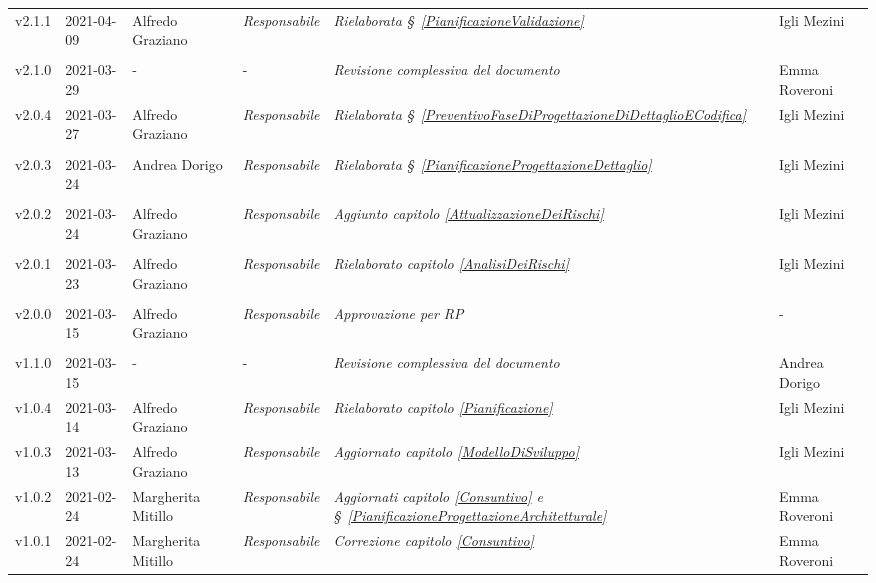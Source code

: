 {\begin{center}
\begin{longtable}[c]{|p{2cm-1\tabcolsep}|p{2cm}|p{3cm-2\tabcolsep}|p{}|p{}|p{4cm-2\tabcolsep}|}
		\hline
		\centering v2.1.1 & 2021-04-09 & Alfredo Graziano & \centering \textit{Responsabile} & \textit{Rielaborata \S~\ref{PianificazioneValidazione} } & \centering Igli Mezini \\ \tabularnewline
		\hline
		\centering v2.1.0 & 2021-03-29 & \centering - & \centering - & \textit{Revisione complessiva del documento} & Emma Roveroni  \\
		\hline
		\centering v2.0.4 & 2021-03-27 & Alfredo Graziano & \centering \textit{Responsabile} & \textit{Rielaborata \S~\ref{PreventivoFaseDiProgettazioneDiDettaglioECodifica} } & \centering Igli Mezini \\ \tabularnewline
		\hline
		\centering v2.0.3 & 2021-03-24 & Andrea Dorigo & \centering \textit{Responsabile} & \textit{Rielaborata \S~\ref{PianificazioneProgettazioneDettaglio}  } & \centering Igli Mezini \\ \tabularnewline
		\hline
		\centering v2.0.2 & 2021-03-24 & Alfredo Graziano & \centering \textit{Responsabile} & \textit{Aggiunto capitolo \ref{AttualizzazioneDeiRischi} } & \centering Igli Mezini \\ \tabularnewline
		\hline
		\centering v2.0.1 & 2021-03-23 & Alfredo Graziano & \centering \textit{Responsabile} & \textit{Rielaborato capitolo \ref{AnalisiDeiRischi} } & \centering Igli Mezini \\ \tabularnewline
		\hline
		\centering v2.0.0 & 2021-03-15 & Alfredo Graziano & \centering \textit{Responsabile} & \textit{Approvazione per RP} & \centering - \\ \tabularnewline
		\hline
		\centering v1.1.0 & 2021-03-15 & \centering - & \centering - & \textit{Revisione complessiva del documento} & Andrea Dorigo  \\
		\hline
		\centering v1.0.4 & 2021-03-14 & Alfredo Graziano & \centering \textit{Responsabile} & \textit{Rielaborato capitolo  \ref{Pianificazione}} & Igli Mezini  \\
		\hline
		\centering v1.0.3 & 2021-03-13 & Alfredo Graziano & \centering \textit{Responsabile} & \textit{Aggiornato capitolo \ref{ModelloDiSviluppo}} & Igli Mezini  \\
		\hline
		\centering v1.0.2 & 2021-02-24 & Margherita Mitillo & \centering \textit{Responsabile} & \textit{Aggiornati capitolo \ref{Consuntivo} e  \S~\ref{PianificazioneProgettazioneArchitetturale}} & Emma Roveroni  \\
		\hline
		\centering v1.0.1 & 2021-02-24 & Margherita Mitillo & \centering \textit{Responsabile} & \textit{Correzione capitolo \ref{Consuntivo}} & Emma Roveroni  \\

\end{longtable}
\end{center}}
